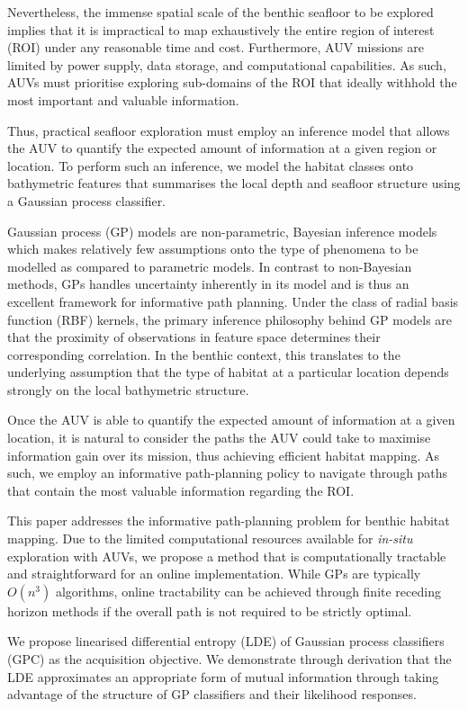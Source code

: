 \documentclass{article}
\begin{document}
	Nevertheless, the immense spatial scale of the benthic seafloor to be explored implies that it is impractical to map exhaustively the entire region of interest (ROI) under any reasonable time and cost. Furthermore, AUV missions are limited by power supply, data storage, and computational capabilities. As such, AUVs must prioritise exploring sub-domains of the ROI that ideally withhold the most important and valuable information.
	
	Thus, practical seafloor exploration must employ an inference model that allows the AUV to quantify the expected amount of information at a given region or location. To perform such an inference, we model the habitat classes onto bathymetric features that summarises the local depth and seafloor structure using a Gaussian process classifier.

	Gaussian process (GP) models are non-parametric, Bayesian inference models which makes relatively few assumptions onto the type of phenomena to be modelled as compared to parametric models. In contrast to non-Bayesian methods, GPs handles uncertainty inherently in its model and is thus an excellent framework for informative path planning. Under the class of radial basis function (RBF) kernels, the primary inference philosophy behind GP models are that the proximity of observations in feature space determines their corresponding correlation. In the benthic context, this translates to the underlying assumption that the type of habitat at a particular location depends strongly on the local bathymetric structure.
		
	Once the AUV is able to quantify the expected amount of information at a given location, it is natural to consider the paths the AUV could take to maximise information gain over its mission, thus achieving efficient habitat mapping. As such, we employ an informative path-planning policy to navigate through paths that contain the most valuable information regarding the ROI. 
	
	This paper addresses the informative path-planning problem for benthic habitat mapping. Due to the limited computational resources available for \textit{in-situ} exploration with AUVs, we propose a method that is computationally tractable and straightforward for an online implementation. While GPs are typically $O(n^{3})$ algorithms, online tractability can be achieved through finite receding horizon methods if the overall path is not required to be strictly optimal.
	
	We propose linearised differential entropy (LDE) of Gaussian process classifiers (GPC) as the acquisition objective. We demonstrate through derivation that the LDE approximates an appropriate form of mutual information through taking advantage of the structure of GP classifiers and their likelihood responses.
	
\end{document}
